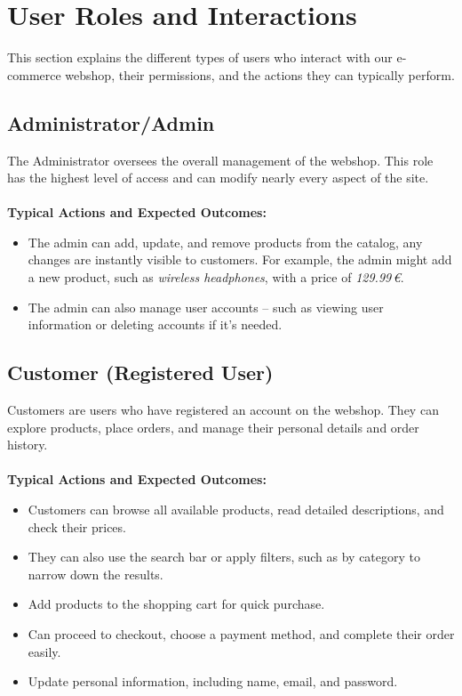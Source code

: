 \documentclass[a4paper,12pt]{article}
\begin{document}
	



	\section{User Roles and Interactions}
	This section explains the different types of users who interact with our e-commerce webshop, their permissions, and the actions they can typically perform.
	\subsection*{Administrator/Admin}
	The Administrator oversees the overall management of the webshop. This role has the highest level of access and can modify nearly every aspect of the site. \\ \\
	\textbf{Typical Actions and Expected Outcomes:}
	\begin{itemize}
		\item The admin can add, update, and remove products from the catalog, any changes are instantly visible to customers. For example, the admin might add a new product, such as  \textit{wireless headphones}, with a price of \textit{129.99\,€}.
		\item The admin can also manage user accounts – such as viewing user \\ information or deleting accounts if it's needed.
	\end{itemize}




	\subsection*{Customer (Registered User)}
	Customers are users who have registered an account on the webshop. They can explore products, place orders, and manage their personal details and order history. \\ \\
	\textbf{Typical Actions and Expected Outcomes:}
	\begin{itemize}
  		\item Customers can browse all available products, read detailed descriptions, and check their prices.
    		\item They can also use the search bar or apply filters, such as by category to narrow down the results.
    		\item Add products to the shopping cart for quick purchase.
    		\item Can proceed to checkout, choose a payment method, and complete their order easily.
    		\item Update personal information, including name, email, and password.
	\end{itemize}
\end{document}
